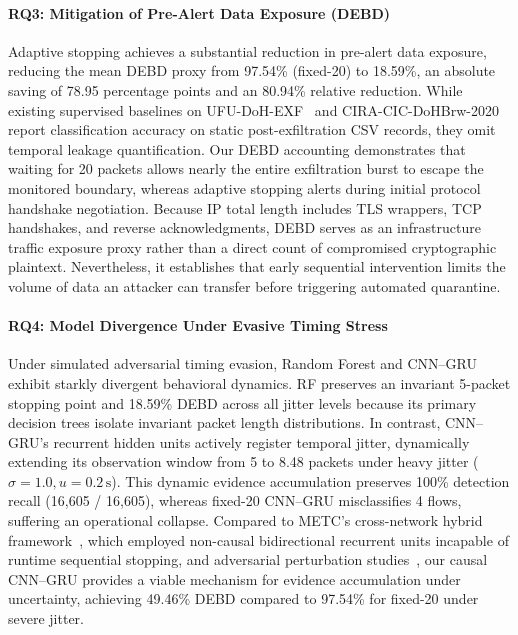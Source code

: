 \documentclass[conference]{IEEEtran}
\begin{document}
\paragraph{RQ3: Mitigation of Pre-Alert Data Exposure (DEBD)}
Adaptive stopping achieves a substantial reduction in pre-alert data exposure, reducing the mean DEBD proxy from 97.54\% (fixed-20) to 18.59\%, an absolute saving of 78.95 percentage points and an 80.94\% relative reduction. While existing supervised baselines on UFU-DoH-EXF~\cite{ufu} and CIRA-CIC-DoHBrw-2020~\cite{abrahim2026,zhan2022,salat2023} report classification accuracy on static post-exfiltration CSV records, they omit temporal leakage quantification. Our DEBD accounting demonstrates that waiting for 20 packets allows nearly the entire exfiltration burst to escape the monitored boundary, whereas adaptive stopping alerts during initial protocol handshake negotiation. Because IP total length includes TLS wrappers, TCP handshakes, and reverse acknowledgments, DEBD serves as an infrastructure traffic exposure proxy rather than a direct count of compromised cryptographic plaintext. Nevertheless, it establishes that early sequential intervention limits the volume of data an attacker can transfer before triggering automated quarantine.

\paragraph{RQ4: Model Divergence Under Evasive Timing Stress}
Under simulated adversarial timing evasion, Random Forest and CNN--GRU exhibit starkly divergent behavioral dynamics. RF preserves an invariant 5-packet stopping point and 18.59\% DEBD across all jitter levels because its primary decision trees isolate invariant packet length distributions. In contrast, CNN--GRU's recurrent hidden units actively register temporal jitter, dynamically extending its observation window from 5 to 8.48 packets under heavy jitter ($\sigma=1.0, u=0.2\,\mathrm{s}$). This dynamic evidence accumulation preserves 100\% detection recall (16,605 / 16,605), whereas fixed-20 CNN--GRU misclassifies 4 flows, suffering an operational collapse. Compared to METC's cross-network hybrid framework~\cite{metc}, which employed non-causal bidirectional recurrent units incapable of runtime sequential stopping, and adversarial perturbation studies~\cite{wu2024,li2025}, our causal CNN--GRU provides a viable mechanism for evidence accumulation under uncertainty, achieving 49.46\% DEBD compared to 97.54\% for fixed-20 under severe jitter.
\end{document}
